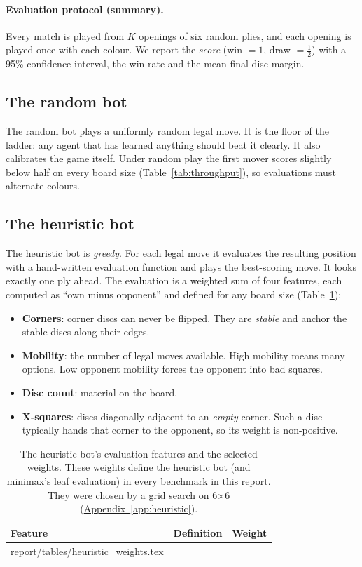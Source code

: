 \documentclass[11pt]{article}
\makeatletter
\newcommand{\bx}[1]{#1$\times$#1}
\newcommand{\appref}[1]{\hyperref[#1]{Appendix~\ref*{#1}}}
\newcommand{\tabinput}[1]{\@@input #1 }
\makeatother
\begin{document}
\paragraph{Evaluation protocol (summary).} Every match is played from $K$
openings of six random plies, and each opening is played once with each colour.
We report the \emph{score} (win $=1$, draw $=\tfrac12$) with a 95\% confidence
interval, the win rate and the mean final disc margin.

\subsection{The random bot}
The random bot plays a uniformly random legal move. It is the floor of the
ladder: any agent that has learned anything should beat it clearly. It also
calibrates the game itself. Under random play the first mover scores slightly
below half on every board size (Table~\ref{tab:throughput}), so evaluations
must alternate colours.

\subsection{The heuristic bot}
\label{sec:heuristic}
The heuristic bot is \emph{greedy}. For each legal move it evaluates the
resulting position with a hand-written evaluation function and plays the
best-scoring move. It looks exactly one ply ahead. The evaluation is a weighted
sum of four features, each computed as ``own minus opponent'' and defined for
any board size (Table~\ref{tab:heuristic_weights}):
\begin{itemize}[leftmargin=*]
  \item \textbf{Corners}: corner discs can never be flipped. They are
        \emph{stable} and anchor the stable discs along their edges.
  \item \textbf{Mobility}: the number of legal moves available. High mobility
        means many options. Low opponent mobility forces the opponent into
        bad squares.
  \item \textbf{Disc count}: material on the board.
  \item \textbf{X-squares}: discs diagonally adjacent to an \emph{empty}
        corner. Such a disc typically hands that corner to the opponent, so
        its weight is non-positive.
\end{itemize}

\begin{table}[H]
\centering
\caption{The heuristic bot's evaluation features and the selected weights. These
weights define the heuristic bot (and minimax's leaf evaluation) in every
benchmark in this report. They were chosen by a grid search on \bx{6}
(\appref{app:heuristic}).}
\label{tab:heuristic_weights}
\begin{tabular}{@{}llr@{}}
\toprule
Feature & Definition & Weight \\
\midrule
\tabinput{report/tables/heuristic_weights.tex}
\bottomrule
\end{tabular}
\end{table}
\end{document}
